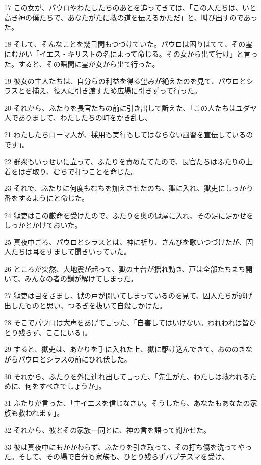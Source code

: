\par 17 この女が、パウロやわたしたちのあとを追ってきては、「この人たちは、いと高き神の僕たちで、あなたがたに救の道を伝えるかただ」と、叫び出すのであった。
\par 18 そして、そんなことを幾日間もつづけていた。パウロは困りはてて、その霊にむかい「イエス・キリストの名によって命じる。その女から出て行け」と言った。すると、その瞬間に霊が女から出て行った。
\par 19 彼女の主人たちは、自分らの利益を得る望みが絶えたのを見て、パウロとシラスとを捕え、役人に引き渡すため広場に引きずって行った。
\par 20 それから、ふたりを長官たちの前に引き出して訴えた、「この人たちはユダヤ人でありまして、わたしたちの町をかき乱し、
\par 21 わたしたちローマ人が、採用も実行もしてはならない風習を宣伝しているのです」。
\par 22 群衆もいっせいに立って、ふたりを責めたてたので、長官たちはふたりの上着をはぎ取り、むちで打つことを命じた。
\par 23 それで、ふたりに何度もむちを加えさせたのち、獄に入れ、獄吏にしっかり番をするようにと命じた。
\par 24 獄吏はこの厳命を受けたので、ふたりを奥の獄屋に入れ、その足に足かせをしっかとかけておいた。
\par 25 真夜中ごろ、パウロとシラスとは、神に祈り、さんびを歌いつづけたが、囚人たちは耳をすまして聞きいっていた。
\par 26 ところが突然、大地震が起って、獄の土台が揺れ動き、戸は全部たちまち開いて、みんなの者の鎖が解けてしまった。
\par 27 獄吏は目をさまし、獄の戸が開いてしまっているのを見て、囚人たちが逃げ出したものと思い、つるぎを抜いて自殺しかけた。
\par 28 そこでパウロは大声をあげて言った、「自害してはいけない。われわれは皆ひとり残らず、ここにいる」。
\par 29 すると、獄吏は、あかりを手に入れた上、獄に駆け込んできて、おののきながらパウロとシラスの前にひれ伏した。
\par 30 それから、ふたりを外に連れ出して言った、「先生がた、わたしは救われるために、何をすべきでしょうか」。
\par 31 ふたりが言った、「主イエスを信じなさい。そうしたら、あなたもあなたの家族も救われます」。
\par 32 それから、彼とその家族一同とに、神の言を語って聞かせた。
\par 33 彼は真夜中にもかかわらず、ふたりを引き取って、その打ち傷を洗ってやった。そして、その場で自分も家族も、ひとり残らずバプテスマを受け、
